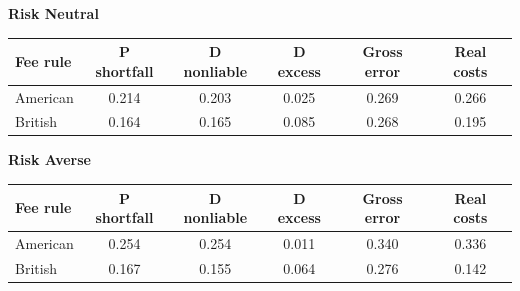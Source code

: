 \documentclass[10pt,border=5pt,varwidth=17cm]{standalone}
\begin{document}
\begingroup
\small
\setlength{\tabcolsep}{5pt}
\renewcommand{\arraystretch}{1.20}
\noindent\textbf{Risk Neutral}\par\smallskip
\noindent\begin{tabularx}{\linewidth}{@{}>{\raggedright\arraybackslash}Xccccc@{}}
\toprule
\textbf{Fee rule} & \textbf{P shortfall} & \textbf{D nonliable} & \textbf{D excess} & \textbf{Gross error} & \textbf{Real costs} \\
\midrule
American & 0.214 & 0.203 & 0.025 & 0.269 & 0.266 \\
British & 0.164 & 0.165 & 0.085 & 0.268 & 0.195 \\
\bottomrule\end{tabularx}\par\medskip
\noindent\textbf{Risk Averse}\par\smallskip
\noindent\begin{tabularx}{\linewidth}{@{}>{\raggedright\arraybackslash}Xccccc@{}}
\toprule
\textbf{Fee rule} & \textbf{P shortfall} & \textbf{D nonliable} & \textbf{D excess} & \textbf{Gross error} & \textbf{Real costs} \\
\midrule
American & 0.254 & 0.254 & 0.011 & 0.340 & 0.336 \\
British & 0.167 & 0.155 & 0.064 & 0.276 & 0.142 \\
\bottomrule\end{tabularx}\par\medskip
\endgroup
\end{document}
